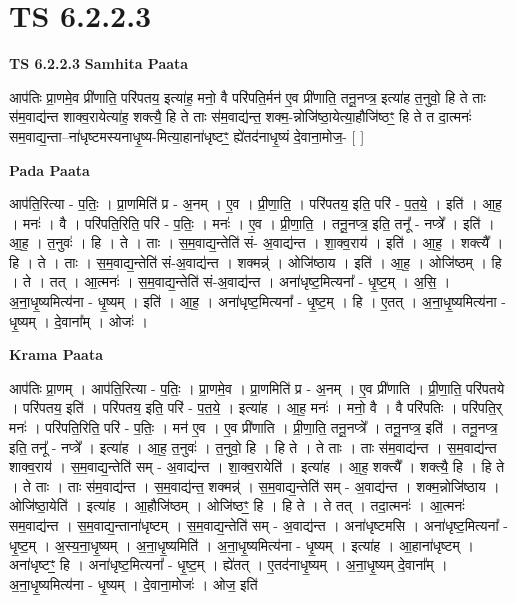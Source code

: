 \documentclass[17pt]{extarticle}
\begin{document}
\section{ TS 6.2.2.3 }

\textbf{TS 6.2.2.3 } \newline
\textbf{Samhita Paata} \newline

आप॑तिः प्रा॒णमे॒व प्री॑णाति॒ परि॑पतय॒ इत्या॑ह॒ मनो॒ वै परि॑पति॒र्मन॑ ए॒व प्री॑णाति॒ तनू॒नप्त्र॒ इत्या॑ह त॒नुवो॒ हि ते ताः स॑म॒वाद्य॑न्त शाक्व॒रायेत्या॑ह॒ शक्त्यै॒ हि ते ताः स॑म॒वाद्य॑न्त॒ शक्म॒-न्नोजि॑ष्ठा॒येत्या॒हौजि॑ष्ठꣳ॒॒ हि ते त दा॒त्मनः॑ सम॒वाद्य॒न्ता--ना॑धृष्टमस्यनाधृ॒ष्य-मित्या॒हाना॑धृष्टꣳ॒॒ ह्ये॑तद॑नाधृ॒ष्यं दे॒वाना॒मोज॒- [  ] \newline

\textbf{Pada Paata} \newline

आप॑ति॒रित्या - प॒तिः॒ । प्रा॒णमिति॑ प्र - अ॒नम् । ए॒व । प्री॒णा॒ति॒ । परि॑पतय॒ इति॒ परि॑ - प॒त॒ये॒ । इति॑ । आ॒ह॒ । मनः॑ । वै । परि॑पति॒रिति॒ परि॑ - प॒तिः॒ । मनः॑ । ए॒व । प्री॒णा॒ति॒ । तनू॒नप्त्र॒ इति॒ तनू᳚ - नप्त्रे᳚ । इति॑ । आ॒ह॒ । त॒नुवः॑ । हि । ते । ताः । स॒म॒वाद्य॒न्तेति॑ सं- अ॒वाद्य॑न्त । शा॒क्व॒राय॑ । इति॑ । आ॒ह॒ । शक्त्यै᳚ । हि । ते । ताः । स॒म॒वाद्य॒न्तेति॑ सं-अ॒वाद्य॑न्त । शक्मन्न्॑ । ओजि॑ष्ठाय । इति॑ । आ॒ह॒ । ओजि॑ष्ठम् । हि । ते । तत् । आ॒त्मनः॑ । स॒म॒वाद्य॒न्तेति॑ सं-अ॒वाद्य॑न्त । अना॑धृष्ट॒मित्यना᳚ - धृ॒ष्ट॒म् । अ॒सि॒ । अ॒ना॒धृ॒ष्यमित्य॑ना - धृ॒ष्यम् । इति॑ । आ॒ह॒ । अना॑धृष्ट॒मित्यना᳚ - धृ॒ष्ट॒म् । हि । ए॒तत् । अ॒ना॒धृ॒ष्यमित्य॑ना - धृ॒ष्यम् । दे॒वाना᳚म् । ओजः॑ ।  \newline


\textbf{Krama Paata} \newline

आप॑तिः प्रा॒णम् । आप॑ति॒रित्या - प॒तिः॒ । प्रा॒णमे॒व । प्रा॒णमिति॑ प्र - अ॒नम् । ए॒व प्री॑णाति । प्री॒णा॒ति॒ परि॑पतये । परि॑पतय॒ इति॑ । परि॑पतय॒ इति॒ परि॑ - प॒त॒ये॒ । इत्या॑ह । आ॒ह॒ मनः॑ । मनो॒ वै । वै परि॑पतिः । परि॑पति॒र् मनः॑ । परि॑पति॒रिति॒ परि॑ - प॒तिः॒ । मन॑ ए॒व । ए॒व प्री॑णाति । प्री॒णा॒ति॒ तनू॒नप्त्रे᳚ । तनू॒नप्त्र॒ इति॑ । तनू॒नप्त्र॒ इति॒ तनू᳚ - नप्त्रे᳚ । इत्या॑ह । आ॒ह॒ त॒नुवः॑ । त॒नुवो॒ हि । हि ते । ते ताः । ताः स॑म॒वाद्य॑न्त । स॒म॒वाद्य॑न्त शाक्व॒राय॑ । स॒म॒वाद्य॒न्तेति॑ सम् - अ॒वाद्य॑न्त । शा॒क्व॒रायेति॑ । इत्या॑ह । आ॒ह॒ शक्त्यै᳚ । शक्त्यै॒ हि । हि ते । ते ताः । ताः स॑म॒वाद्य॑न्त । स॒म॒वाद्य॑न्त॒ शक्मन्न्॑ । स॒म॒वाद्य॒न्तेति॑ सम् - अ॒वाद्य॑न्त । शक्म॒न्नोजि॑ष्ठाय । ओजि॑ष्ठा॒येति॑ । इत्या॑ह । आ॒हौजि॑ष्ठम् । ओजि॑ष्ठꣳ॒॒ हि । हि ते । ते तत् । तदा॒त्मनः॑ । आ॒त्मनः॑ सम॒वाद्य॑न्त । स॒म॒वाद्य॒न्ताना॑धृष्टम् । स॒म॒वाद्य॒न्तेति॑ सम् - अ॒वाद्य॑न्त । अना॑धृष्टमसि । अना॑धृष्ट॒मित्यना᳚ - धृ॒ष्ट॒म् । अ॒स्य॒ना॒धृ॒ष्यम् । अ॒ना॒धृ॒ष्यमिति॑ । अ॒ना॒धृ॒ष्यमित्य॑ना - धृ॒ष्यम् । इत्या॑ह । आ॒हाना॑धृष्टम् । अना॑धृष्टꣳ॒॒ हि । अना॑धृष्ट॒मित्यना᳚ - धृ॒ष्ट॒म् । ह्ये॑तत् । ए॒तद॑नाधृ॒ष्यम् । अ॒ना॒धृ॒ष्यम् दे॒वाना᳚म् । अ॒ना॒धृ॒ष्यमित्य॑ना - धृ॒ष्यम् । दे॒वाना॒मोजः॑ । ओज॒ इति॑ \newline
\end{document}
